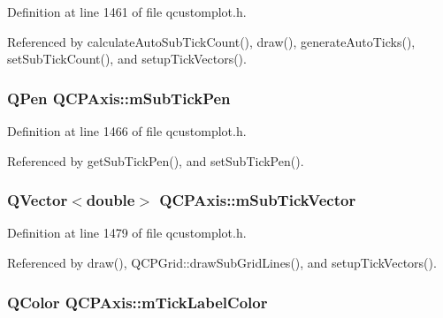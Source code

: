 Definition at line 1461 of file qcustomplot.\+h.



Referenced by calculate\+Auto\+Sub\+Tick\+Count(), draw(), generate\+Auto\+Ticks(), set\+Sub\+Tick\+Count(), and setup\+Tick\+Vectors().

\hypertarget{class_q_c_p_axis_a32ef56d3a417866720eb12667d27dbd1}{}
\subsubsection[{m\+Sub\+Tick\+Pen}]{\setlength{\rightskip}{0pt plus 5cm}Q\+Pen Q\+C\+P\+Axis\+::m\+Sub\+Tick\+Pen\hspace{0.3cm}{\ttfamily [protected]}}\label{class_q_c_p_axis_a32ef56d3a417866720eb12667d27dbd1}


Definition at line 1466 of file qcustomplot.\+h.



Referenced by get\+Sub\+Tick\+Pen(), and set\+Sub\+Tick\+Pen().

\hypertarget{class_q_c_p_axis_a28353081e0ff35c3fe5ced923a287faa}{}
\subsubsection[{m\+Sub\+Tick\+Vector}]{\setlength{\rightskip}{0pt plus 5cm}Q\+Vector$<$double$>$ Q\+C\+P\+Axis\+::m\+Sub\+Tick\+Vector\hspace{0.3cm}{\ttfamily [protected]}}\label{class_q_c_p_axis_a28353081e0ff35c3fe5ced923a287faa}


Definition at line 1479 of file qcustomplot.\+h.



Referenced by draw(), Q\+C\+P\+Grid\+::draw\+Sub\+Grid\+Lines(), and setup\+Tick\+Vectors().

\hypertarget{class_q_c_p_axis_a6384a749b3b56a97df081d8082321ab4}{}
\subsubsection[{m\+Tick\+Label\+Color}]{\setlength{\rightskip}{0pt plus 5cm}Q\+Color Q\+C\+P\+Axis\+::m\+Tick\+Label\+Color\hspace{0.3cm}{\ttfamily [protected]}}\label{class_q_c_p_axis_a6384a749b3b56a97df081d8082321ab4}


